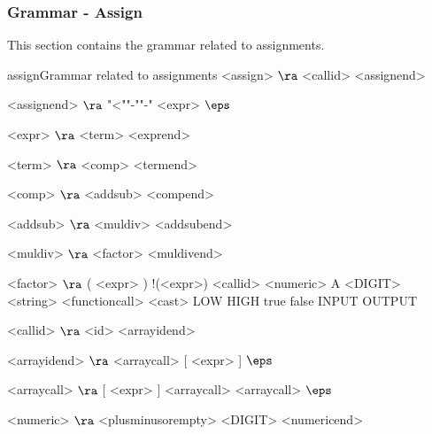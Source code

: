 \subsubsection{Grammar - Assign}
This section contains the grammar related to assignments.
\begin{grammatik}{assign}{Grammar related to assignments}
<assign> $\ra$ <callid> <assignend>

<assignend> $\ra$ "<""-""-" <expr>
\alt $\eps$

<expr> $\ra$ <term> <exprend>

<term> $\ra$ <comp> <termend>

<comp> $\ra$ <addsub> <compend>

<addsub> $\ra$ <muldiv> <addsubend>

<muldiv> $\ra$ <factor> <muldivend>

<factor> $\ra$ ( <expr> )
	\alt !(<expr>)
	\alt <callid>
	\alt <numeric>
	\alt A <DIGIT>
	\alt <string>
	\alt <functioncall>
	\alt <cast>
	\alt LOW
	\alt HIGH
	\alt true
	\alt false
	\alt INPUT 
	\alt OUTPUT 

<callid> $\ra$ <id> <arrayidend>

<arrayidend> $\ra$ <arraycall> [ <expr> ]
\alt $\eps$

<arraycall> $\ra$   [ <expr> ] <arraycall>
\alt  [ ] <arraycall>
\alt $\eps$

<numeric> $\ra$ <plusminusorempty> <DIGIT> <numericend>
\end{grammatik}

